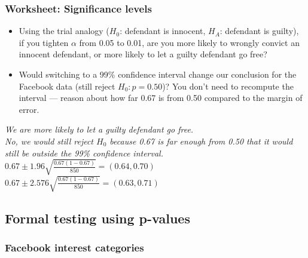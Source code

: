 \documentclass[t,compress,mathserif]{beamer}
\newcommand{\soln}[1]{\textit{#1}}
\begin{document}
\begin{frame}
\frametitle{Worksheet: Significance levels}
\begin{itemize}
  \item Using the trial analogy ($H_0$: defendant is innocent, $H_A$: defendant is guilty), if you tighten $\alpha$ from 0.05 to 0.01, are you more likely to wrongly convict an innocent defendant, or more likely to let a guilty defendant go free?
  \item Would switching to a 99\% confidence interval change our conclusion for the Facebook data (still reject $H_0: p=0.50$)? You don't need to recompute the interval --- reason about how far 0.67 is from 0.50 compared to the margin of error.
\end{itemize}
\pause
\soln{\emph{We are more likely to let a guilty defendant go free.} \\}
\pause
\soln{\emph{No, we would still reject $H_0$ because 0.67 is far enough from 0.50 that it would still be outside the 99\% confidence interval.} \\
$0.67 \pm 1.96 \sqrt{\frac{0.67(1-0.67)}{850}} = (0.64, 0.70)$ \\
$0.67 \pm 2.576 \sqrt{\frac{0.67(1-0.67)}{850}} = (0.63, 0.71)$}

\end{frame}



\subsection{Formal testing using p-values}


\begin{frame}
\frametitle{Facebook interest categories}


\vfill


\end{frame}

\end{document}
